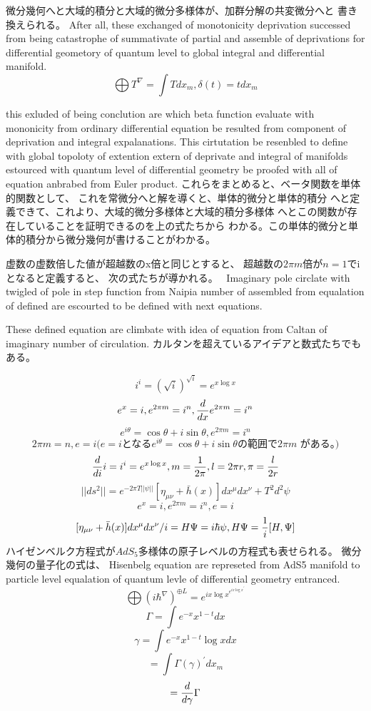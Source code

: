 \documentclass{jsarticle}
\begin{document}
{   微分幾何へと大域的積分と大域的微分多様体が、加群分解の共変微分へと
   書き換えられる。
   After all, these exchanged of monotonicity deprivation successed from
   being catastrophe of summativate of partial and assemble of deprivations
   for differential geometory of quantum level to global integral and
   differential manifold.
   $$ \bigoplus T^{\nabla}  = \int T dx_m, \delta(t) = t dx_m  $$


   this exluded of being conclution are which beta function
   evaluate with mononicity from ordinary differential equation
   be resulted from component of deprivation and integral expalanations.
   This cirtutation be resenbled to define with global topoloty of
   extention extern of deprivate and integral of manifolds
   estourced with quantum level of differential geometry be proofed with
   all of equation anbrabed from Euler product.
   これらをまとめると、ベータ関数を単体的関数として、
   これを常微分へと解を導くと、単体的微分と単体的積分
   へと定義できて、これより、大域的微分多様体と大域的積分多様体
   へとこの関数が存在していることを証明できるのを上の式たちから
   わかる。この単体的微分と単体的積分から微分幾何が書けることがわかる。



   虚数の虚数倍した値が超越数のx倍と同じとすると、
   超越数の$2 \pi m$倍が$n=1$でiとなると定義すると、
   次の式たちが導かれる。　
   Imaginary pole circlate with twigled of pole in step function
   from Naipia number of assembled from equalation of defined are
   escourted to be defined with next equations.


   These defined equation are climbate with idea of equation from
   Caltan of imaginary number of circulation.
   カルタンを超えているアイデアと数式たちでもある。

   $$ i^i = (\sqrt{i})^{\sqrt{i}} = e^{x \log x} $$
   $$ e^x = i, e^{2\pi m} = i^n, {d \over d x}e^{2\pi m} = i^n $$
   $$ e^{i \theta} = \cos \theta + i \sin \theta, e^{2 \pi m} = i^n $$
   $$ 2 \pi m = n, e = i \text{($e=i$となる$e^{i \theta} = \cos \theta 
   + i \sin \theta $
   の範囲で$2\pi m$ がある。)}$$
   $$ {d \over d i}i = i^i = e^{x \log x}, m={1 \over 2 \pi},l=2\pi r, 
   \pi = {l \over 2r} $$
   $$ ||ds^2|| = e^{-2 \pi T||\psi||}[\eta_{\mu\nu} + \bar{h}(x)]
   dx^{\mu}dx^{\nu} + T^2 d^2 \psi $$
   $$ e^x = i, e^{2\pi m} = i^n, e = i $$
   $$ {{[\eta_{\mu\nu} + \bar{h}(x)]dx^{\mu}dx^{\nu}}/i} = H \Psi
   = i \hbar \psi, H \Psi = {1 \over i}[H, \Psi] $$
   ハイゼンベルク方程式が$ AdS_5 $多様体の原子レベルの方程式も表せられる。 
   微分幾何の量子化の式は、
   Hisenbelg equation are represeted from AdS5 manifold to particle level
   equalation of quantum levle of differential geometry entranced.
   $$ \bigoplus {({i \hbar} ^{\nabla})}^{\oplus L} = e^{{i x \log x}^{
	   {e^{i x \log x}}^{'}}} $$
   $$ \Gamma = \int e^{-x}x^{1 - t}dx $$
   $$ \gamma = \int e^{-x}x^{1 - t}\log x dx $$
   $$ = \int \Gamma(\gamma)^{'} dx_m$$
   $$ = {d \over d \gamma}\Gamma $$

}
\end{document}
